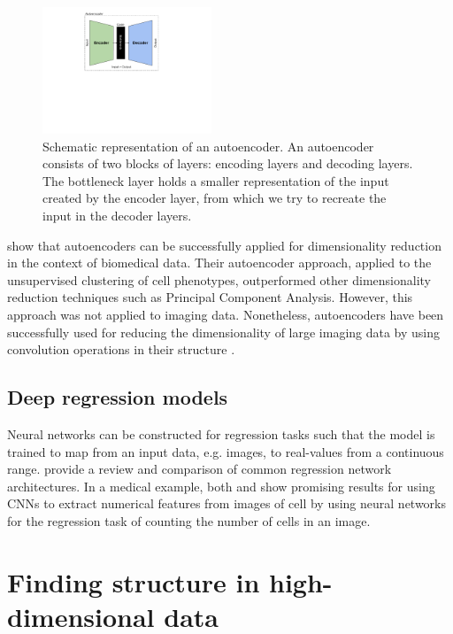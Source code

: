 \begin{figure}[h!]
    \centering
    \includegraphics[width=0.45\textwidth]{dissertation/figures/autoencoder_schema.pdf}
    \caption{Schematic representation of an autoencoder. An autoencoder consists of two blocks of layers: encoding layers and decoding layers. The bottleneck layer holds a smaller representation of the input created by the encoder layer, from which we try to recreate the input in the decoder layers.}
    \label{fig:autoencoder}
\end{figure}

\citet{Zamparo2015} show that autoencoders can be successfully applied for dimensionality reduction in the context of biomedical data. Their autoencoder approach, applied to the unsupervised clustering of cell phenotypes, outperformed other dimensionality reduction techniques such as Principal Component Analysis. However, this approach was not applied to imaging data. Nonetheless, autoencoders have been successfully used for reducing the dimensionality of large imaging data by using convolution operations in their structure \citep{wang2016, saenz2018}.

\subsection{Deep regression models}

Neural networks can be constructed for regression tasks such that the model is trained to map from an input data, e.g. images, to real-values from a continuous range. \citet{Lathu2018} provide a review and comparison of common regression network architectures. In a medical example, both \citet{Xie15} and \citet{Xue2017} show promising results for using CNNs to extract numerical features from images of cell by using neural networks for the regression task of counting the number of cells in an image. 

\section{Finding structure in high-dimensional data} \label{sec:bg_visualisation}

